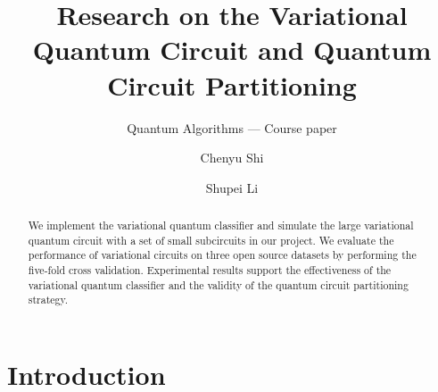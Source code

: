 \documentclass[sigconf]{acmart}
\begin{document}
\title{Research on the Variational Quantum Circuit and Quantum Circuit Partitioning}
\subtitle{Quantum Algorithms --- Course paper} %

\author{Chenyu Shi}

\author{Shupei Li}

\renewcommand{\shortauthors}{Shi and Li}


\begin{abstract}
We implement the variational quantum classifier and simulate the large variational quantum circuit with a set of small subcircuits in our project. We evaluate the performance of variational circuits on three open source datasets by performing the five-fold cross validation. Experimental results support the effectiveness of the variational quantum classifier and the validity of the quantum circuit partitioning strategy.

\end{abstract}

\maketitle

\section{Introduction}

\end{document}
